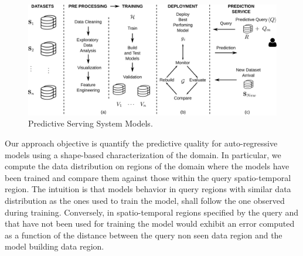 \begin{figure}[h]
	\centering
	\includegraphics[scale=0.3]{../Figures/ModelManagementPS-VersionCompleta}
	\caption{Predictive Serving System Models.}
	\label{Fig:MotiPoster}
\end{figure}

Our approach objective is quantify the predictive quality for auto-regressive models using a shape-based characterization of the domain. 
In particular, we compute the data distribution on regions of the domain where the models have been trained and compare them against those within the query spatio-temporal region. The intuition is that models behavior in query regions with similar data distribution as the ones used to train the model, shall follow the one observed during training. Conversely, in spatio-temporal regions specified by the query and that have not been used for training the model would exhibit an error computed as a function of the distance between the query non seen data region and the model building data region.



